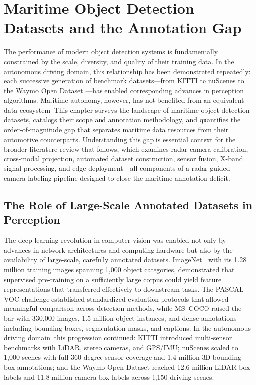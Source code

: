 \section{Maritime Object Detection Datasets and the Annotation Gap}
\label{sec:maritime_datasets}

The performance of modern object detection systems is fundamentally constrained by the
scale, diversity, and quality of their training data. In the autonomous driving domain, this
relationship has been demonstrated repeatedly: each successive generation of benchmark
datasets---from KITTI \cite{Geiger2012KITTI} to nuScenes \cite{Caesar2020nuScenes} to
the Waymo Open Dataset \cite{Sun2020Waymo}---has enabled corresponding advances in
perception algorithms. Maritime autonomy, however, has not benefited from an equivalent
data ecosystem. This chapter surveys the landscape of maritime object detection datasets,
catalogs their scope and annotation methodology, and quantifies the order-of-magnitude gap
that separates maritime data resources from their automotive counterparts. Understanding
this gap is essential context for the broader literature review that follows, which examines
radar-camera calibration, cross-modal projection, automated dataset construction, sensor
fusion, X-band signal processing, and edge deployment---all components of a radar-guided
camera labeling pipeline designed to close the maritime annotation deficit.

\subsection{The Role of Large-Scale Annotated Datasets in Perception}
\label{subsec:role_of_datasets}

The deep learning revolution in computer vision was enabled not only by advances in
network architectures and computing hardware but also by the availability of large-scale,
carefully annotated datasets. ImageNet \cite{Russakovsky2015ImageNet}, with its 1.28
million training images spanning 1,000 object categories, demonstrated that supervised
pre-training on a sufficiently large corpus could yield feature representations that
transferred effectively to downstream tasks. The PASCAL VOC challenge
\cite{everingham2010pascal} established standardized evaluation protocols that allowed
meaningful comparison across detection methods, while MS~COCO \cite{Lin2014COCO}
raised the bar with 330,000 images, 1.5 million object instances, and dense annotations
including bounding boxes, segmentation masks, and captions. In the autonomous driving
domain, this progression continued: KITTI \cite{Geiger2012KITTI} introduced multi-sensor
benchmarks with LiDAR, stereo cameras, and GPS/IMU; nuScenes \cite{Caesar2020nuScenes}
scaled to 1,000 scenes with full 360-degree sensor coverage and 1.4 million 3D bounding
box annotations; and the Waymo Open Dataset \cite{Sun2020Waymo} reached 12.6 million
LiDAR box labels and 11.8 million camera box labels across 1,150 driving scenes.

